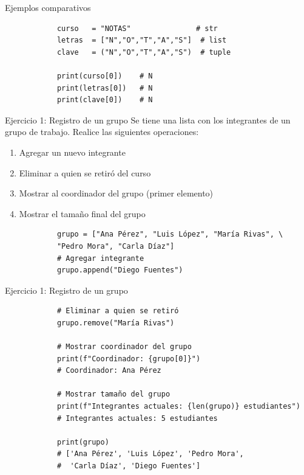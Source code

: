 \documentclass{beamer}
\begin{document}
    \begin{frame}[fragile, t]{Ejemplos comparativos}
        \begin{verbatim}
            curso   = "NOTAS"               # str
            letras  = ["N","O","T","A","S"]  # list
            clave   = ("N","O","T","A","S")  # tuple
             
            print(curso[0])    # N
            print(letras[0])   # N
            print(clave[0])    # N
        \end{verbatim}
    \end{frame}

    \begin{frame}[fragile, t]{Ejercicio 1: Registro de un grupo}
        Se tiene una lista con los integrantes de un grupo de trabajo. Realice las siguientes operaciones:
        \begin{enumerate}
            \item Agregar un nuevo integrante
            \item Eliminar a quien se retiró del curso
            \item Mostrar al coordinador del grupo (primer elemento)
            \item Mostrar el tamaño final del grupo
        \end{enumerate}
        \begin{verbatim}
            grupo = ["Ana Pérez", "Luis López", "María Rivas", \
            "Pedro Mora", "Carla Díaz"]
            # Agregar integrante
            grupo.append("Diego Fuentes")
        \end{verbatim}
    \end{frame}

    \begin{frame}[fragile, t]{Ejercicio 1: Registro de un grupo}
        \begin{verbatim}
            # Eliminar a quien se retiró
            grupo.remove("María Rivas")
             
            # Mostrar coordinador del grupo
            print(f"Coordinador: {grupo[0]}")
            # Coordinador: Ana Pérez
             
            # Mostrar tamaño del grupo
            print(f"Integrantes actuales: {len(grupo)} estudiantes")
            # Integrantes actuales: 5 estudiantes
             
            print(grupo)
            # ['Ana Pérez', 'Luis López', 'Pedro Mora',
            #  'Carla Díaz', 'Diego Fuentes']
        \end{verbatim}
    \end{frame}
\end{document}
